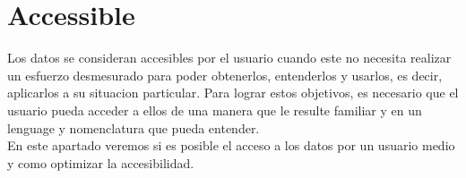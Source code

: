 \newpage
\section{Accessible}

Los datos se consideran accesibles por el usuario cuando este no necesita realizar un esfuerzo desmesurado para
poder obtenerlos, entenderlos y usarlos, es decir, aplicarlos a su situacion particular. Para lograr estos objetivos,
es necesario que el usuario pueda acceder a ellos de una manera que le resulte familiar y en un lenguage y nomenclatura
que pueda entender.\\ 

En este apartado veremos si es posible el acceso a los datos por un usuario medio y como optimizar la accesibilidad.








\begin{figure}[ht]
  \centering
  \end{figure}

    
